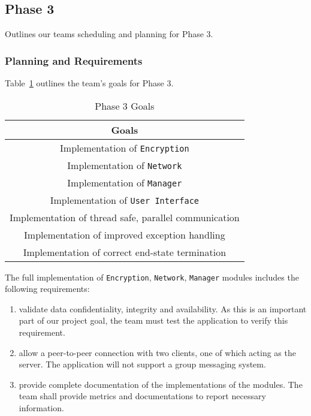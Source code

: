 \documentclass[sigconf]{acmart}
\begin{document}
\subsection{Phase 3}
Outlines our teams scheduling and planning for Phase 3.

\subsubsection{Planning and Requirements}
Table~\ref{Phase 3 Goals} outlines the team's goals for Phase 3.
\begin{table}[htb]
	\centering
	\caption{Phase 3 Goals}
	\label{Phase 3 Goals}

	\begin{tabular}{|c|} \hline
		\textbf{Goals}                                        \\ \hline
		Implementation of \texttt{Encryption}                 \\ \hline
		Implementation of \texttt{Network}                    \\ \hline
		Implementation of \texttt{Manager}                    \\ \hline
		Implementation of \texttt{User Interface}             \\ \hline
		Implementation of thread safe, parallel communication \\ \hline
		Implementation of improved exception handling         \\ \hline
		Implementation of correct end-state termination       \\ \hline
	\end{tabular}
\end{table}
\newline
The full implementation of \texttt{Encryption}, \texttt{Network}, \texttt{Manager} modules includes
the following requirements:
\begin{enumerate}
	\item validate data confidentiality, integrity and availability. As this is an important
	      part of our project goal, the team must test the application to verify this
	      requirement.
	\item allow a peer-to-peer connection with two clients, one of which acting as the server.
	      The application will not support a group messaging system.
	\item provide complete documentation of the implementations of the modules. The team shall
	      provide metrics and documentations to report necessary information.
\end{enumerate}
\end{document}
